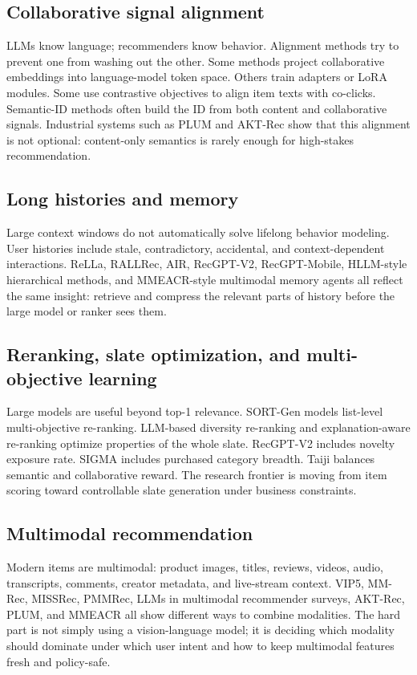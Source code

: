 \documentclass[11pt]{article}
\begin{document}
\subsection{Collaborative signal alignment}

LLMs know language; recommenders know behavior. Alignment methods try to prevent one from washing out the other. Some methods project collaborative embeddings into language-model token space. Others train adapters or LoRA modules. Some use contrastive objectives to align item texts with co-clicks. Semantic-ID methods often build the ID from both content and collaborative signals. Industrial systems such as PLUM and AKT-Rec show that this alignment is not optional: content-only semantics is rarely enough for high-stakes recommendation.

\subsection{Long histories and memory}

Large context windows do not automatically solve lifelong behavior modeling. User histories include stale, contradictory, accidental, and context-dependent interactions. ReLLa, RALLRec, AIR, RecGPT-V2, RecGPT-Mobile, HLLM-style hierarchical methods, and MMEACR-style multimodal memory agents all reflect the same insight: retrieve and compress the relevant parts of history before the large model or ranker sees them.

\subsection{Reranking, slate optimization, and multi-objective learning}

Large models are useful beyond top-1 relevance. SORT-Gen models list-level multi-objective re-ranking. LLM-based diversity re-ranking and explanation-aware re-ranking optimize properties of the whole slate. RecGPT-V2 includes novelty exposure rate. SIGMA includes purchased category breadth. Taiji balances semantic and collaborative reward. The research frontier is moving from item scoring toward controllable slate generation under business constraints.

\subsection{Multimodal recommendation}

Modern items are multimodal: product images, titles, reviews, videos, audio, transcripts, comments, creator metadata, and live-stream context. VIP5, MM-Rec, MISSRec, PMMRec, LLMs in multimodal recommender surveys, AKT-Rec, PLUM, and MMEACR all show different ways to combine modalities. The hard part is not simply using a vision-language model; it is deciding which modality should dominate under which user intent and how to keep multimodal features fresh and policy-safe.
\end{document}
